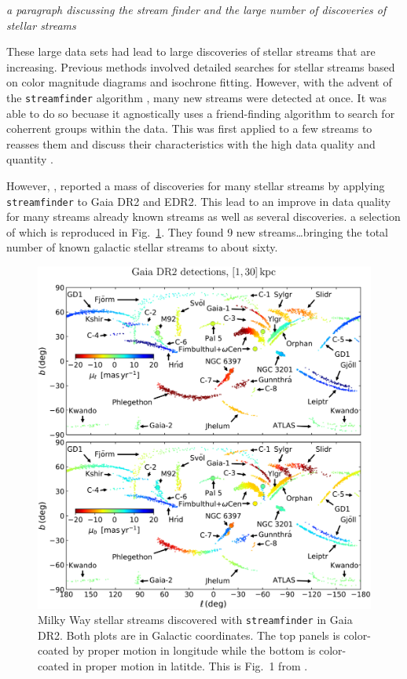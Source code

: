     \textit{a paragraph discussing the stream finder and the large number of discoveries of stellar streams}

    These large data sets had lead to large discoveries of stellar streams that are increasing. Previous methods involved detailed searches for stellar streams based on color magnitude diagrams and isochrone fitting. However, with the advent of the \texttt{streamfinder} algorithm \citep{2018MNRAS.477.4063M, 2018MNRAS.478.3862M}, many new streams were detected at once. It was able to do so becuase it agnostically uses a friend-finding algorithm to search for coherrent groups within the data. This was first applied to a few streams to reasses them and discuss their characteristics with the high data quality and quantity \citet{2019NatAs...3..667I,2020ApJ...891..161I}. 
    
    However, \citet{2021ApJ...914..123I}, reported a mass of discoveries for many stellar streams by applying \texttt{streamfinder} to Gaia DR2 and EDR2. This lead to an improve in data quality for many streams already known streams as well as several discoveries. a selection of which is reproduced in Fig.~\ref{fig:ibata_2021_fig1}. They found 9 new streams\dots bringing the total number of known galactic stellar streams to about sixty. 
    \begin{figure}
        \centering
        \includegraphics[width=\linewidth]{images/ibata_2021_fig1.jpg}
        \caption[Milky Way stellar streams discovered with \texttt{streamfinder} in Gaia DR2]{Milky Way stellar streams discovered with \texttt{streamfinder} in Gaia DR2. Both plots are in Galactic coordinates. The top panels is color-coated by proper motion in longitude while the bottom is color-coated in proper motion in latitde. This is Fig.~1 from \citet{2021ApJ...914..123I}. }
        \label{fig:ibata_2021_fig1}
    \end{figure}       


